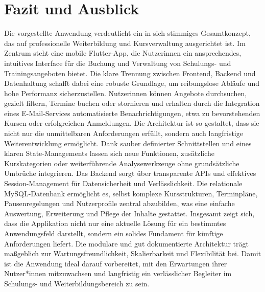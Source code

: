 \chapter{Fazit und Ausblick}

Die vorgestellte Anwendung verdeutlicht ein in sich stimmiges Gesamtkonzept, das auf professionelle Weiterbildung und 
Kursverwaltung ausgerichtet ist. Im Zentrum steht eine mobile Flutter-App, die Nutzerinnen ein ansprechendes, intuitives 
Interface für die Buchung und Verwaltung von Schulungs- und Trainingsangeboten bietet. Die klare Trennung zwischen Frontend,
 Backend und Datenhaltung schafft dabei eine robuste Grundlage, um reibungslose Abläufe und hohe Performanz sicherzustellen. 
 Nutzerinnen können Angebote durchsuchen, gezielt filtern, Termine buchen oder stornieren und erhalten durch die Integration 
 eines E-Mail-Services automatisierte Benachrichtigungen, etwa zu bevorstehenden Kursen oder erfolgreichen Anmeldungen.
Die Architektur ist so gestaltet, dass sie nicht nur die unmittelbaren Anforderungen erfüllt, sondern auch langfristige 
Weiterentwicklung ermöglicht. Dank sauber definierter Schnittstellen und eines klaren State-Managements lassen sich neue 
Funktionen, zusätzliche Kurskategorien oder weiterführende Analysewerkzeuge ohne grundsätzliche Umbrüche integrieren.
 Das Backend sorgt über transparente APIs und effektives Session-Management für Datensicherheit und Verlässlichkeit. 
 Die relationale MySQL-Datenbank ermöglicht es, selbst komplexe Kursstrukturen, Terminpläne, Pausenregelungen und Nutzerprofile 
 zentral abzubilden, was eine einfache Auswertung, Erweiterung und Pflege der Inhalte gestattet.
Insgesamt zeigt sich, dass die Applikation nicht nur eine aktuelle Lösung für ein bestimmtes Anwendungsfeld darstellt,
sondern ein solides Fundament für künftige Anforderungen liefert. Die modulare und gut dokumentierte Architektur trägt
maßgeblich zur Wartungsfreundlichkeit, Skalierbarkeit und Flexibilität bei. Damit ist die Anwendung ideal darauf vorbereitet,
mit den Erwartungen ihrer Nutzer*innen mitzuwachsen und langfristig ein verlässlicher Begleiter im Schulungs-
und Weiterbildungsbereich zu sein.
